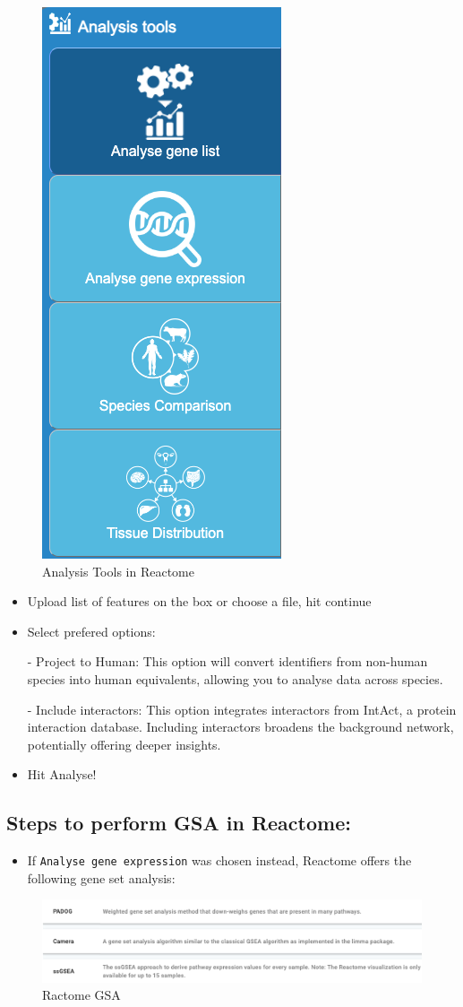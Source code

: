 \documentclass[
]{book}
\providecommand{\tightlist}{%
  \setlength{\itemsep}{0pt}\setlength{\parskip}{0pt}}
\begin{document}
\begin{figure}

{\centering \includegraphics[width=0.2\linewidth]{images/reactome-analysis-tools} 

}

\caption{Analysis Tools in Reactome}\label{fig:unnamed-chunk-28}
\end{figure}

\begin{itemize}
\item
  Upload list of features on the box or choose a file, hit continue
\item
  Select prefered options:

  - Project to Human: This option will convert identifiers from non-human species into human equivalents, allowing you to analyse data across species.

  - Include interactors: This option integrates interactors from IntAct, a protein interaction database. Including interactors broadens the background network, potentially offering deeper insights.
\item
  Hit Analyse!
\end{itemize}

\hypertarget{steps-to-perform-gsa-in-reactome}{%
\subsection{Steps to perform GSA in Reactome:}\label{steps-to-perform-gsa-in-reactome}}

\begin{itemize}
\tightlist
\item
  If \texttt{Analyse\ gene\ expression} was chosen instead, Reactome offers the following gene set analysis:
\end{itemize}

\begin{figure}

{\centering \includegraphics[width=1\linewidth]{images/reactome-gsea-methods} 

}

\caption{Ractome GSA }\label{fig:unnamed-chunk-29}
\end{figure}
\end{document}
